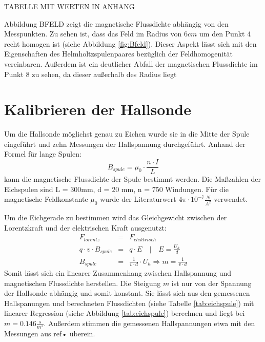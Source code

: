 TABELLE MIT WERTEN IN ANHANG

Abbildung BFELD zeigt die magnetische Flussdichte abhängig von den Messpunkten. Zu sehen ist, dass das Feld im Radius von $6 cm$ um den Punkt 4 recht homogen ist (siehe Abbildung \ref{fig:Bfeld}). Dieser Aspekt lässt sich mit den Eigenschaften des Helmholtzspulenpaares bezüglich der Feldhomogenität vereinbaren. Außerdem ist ein deutlicher Abfall der magnetischen Flussdichte im Punkt 8 zu sehen, da dieser außerhalb des Radius liegt

\section{Kalibrieren der Hallsonde}
Um die Hallsonde möglichst genau zu Eichen wurde sie in die Mitte der Spule eingeführt und zehn Messungen der Hallspannung durchgeführt. Anhand der Formel für lange Spulen:
\begin{equation*}
B_{spule} = \mu_0 \cdot \frac{n \cdot I}{L}
\end{equation*}
kann die magnetische Flussdichte der Spule bestimmt werden. Die Maßzahlen der Eichspulen sind L = 300mm, d = 20 mm, n = 750 Windungen. Für die magnetische Feldkonstante $\mu_0$ wurde der Literaturwert $4\pi \cdot 10^{-7} \frac{N}{A^2}$ verwendet.

Um die Eichgerade zu bestimmen wird das Gleichgewicht zwischen der Lorentzkraft und der elektrischen Kraft ausgenutzt:
\begin{eqnarray*}
F_{lorentz} &=& F_{elektrisch} \\
q \cdot v \cdot B_{spule} &=& q \cdot E \quad | \quad E = \frac{U_h}{d}\\
B_{spule} &=&\frac{1}{v \cdot d} \cdot U_h \Rightarrow m = \frac{1}{v \cdot d}
\end{eqnarray*}
Somit lässt sich ein linearer Zusammenhang zwischen Hallspannung und magnetischen Flussdichte herstellen. Die Steigung $m$ ist nur von der Spannung der Hallsonde abhängig und somit konstant. Sie lässt sich aus den gemessenen Hallspanungen und berechneten Flussdichten (siehe Tabelle \ref{tab:eichspule}) mit linearer Regression (siehe Abbildung \ref{tab:eichspule}) berechnen und liegt bei $m = 0.146 \frac{s}{m^2}$. Außerdem stimmen die gemessenen Hallspannungen etwa mit den Messungen aus ref{•} überein.


